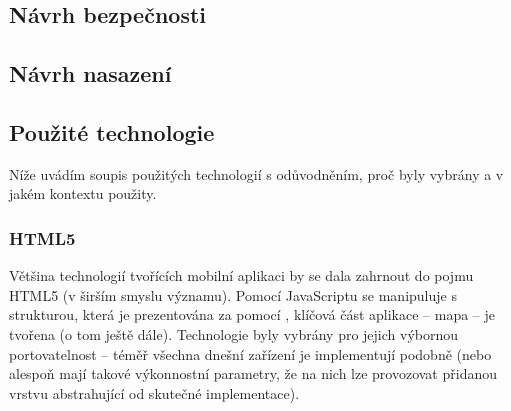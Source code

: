 % 
% 

\subsection{Návrh bezpečnosti}

\subsection{Návrh nasazení}


\subsection{Použité technologie}
Níže uvádím soupis použitých technologií s odůvodněním, proč byly vybrány a v jakém kontextu použity.

\subsubsection{HTML5}
Většina technologií tvořících mobilní aplikaci by se dala zahrnout do pojmu HTML5 (v širším smyslu významu). Pomocí JavaScriptu se manipuluje s  strukturou, která je prezentována za pomocí , klíčová část aplikace -- mapa -- je tvořena  (o tom ještě dále). Technologie byly vybrány pro jejich výbornou portovatelnost -- téměř všechna dnešní zařízení je implementují podobně (nebo alespoň mají takové výkonnostní parametry, že na nich lze provozovat přidanou vrstvu abstrahující od skutečné implementace).

